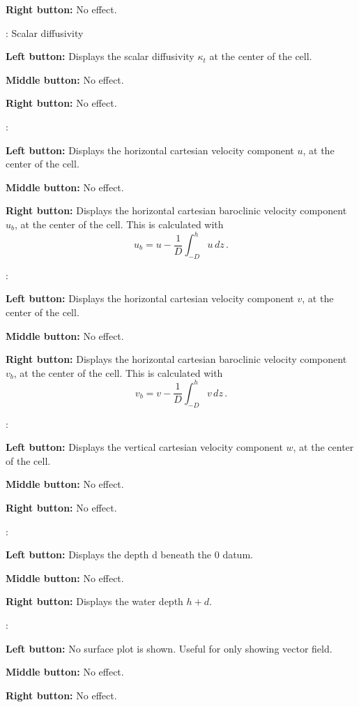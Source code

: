 \documentclass[12pt,oneside]{article}
\begin{document}
\begin{list}{}
\begin{list}{}
\item {\bf Right button:} No effect.
\end{list}
\item {}: Scalar diffusivity
\begin{list}{}
\item {\bf Left button:} Displays the scalar diffusivity $\kappa_t$ at the center of the cell.
\item {\bf Middle button:} No effect.
\item {\bf Right button:} No effect.
\end{list}
\item {}: 
\begin{list}{}
\item {\bf Left button:} Displays the horizontal cartesian velocity component $u$, at the center of the cell.
\item {\bf Middle button:} No effect.
\item {\bf Right button:} Displays the horizontal cartesian baroclinic velocity component $u_b$, at the center of the cell.
This is calculated with
\[
u_b = u - \frac{1}{D}\int_{-D}^h u\,dz\,.
\]
\end{list}
\item {}: 
\begin{list}{}
\item {\bf Left button:} Displays the horizontal cartesian velocity component $v$, at the center of the cell.
\item {\bf Middle button:} No effect.
\item {\bf Right button:} Displays the horizontal cartesian baroclinic velocity component $v_b$, at the center of the cell.
This is calculated with
\[
v_b = v - \frac{1}{D}\int_{-D}^h v\,dz\,.
\]
\end{list}
\item {}: 
\begin{list}{}
\item {\bf Left button:} Displays the vertical cartesian velocity component $w$, at the center of the cell.
\item {\bf Middle button:} No effect.
\item {\bf Right button:} No effect.
\end{list}
\item {}: 
\begin{list}{}
\item {\bf Left button:} Displays the depth d beneath the 0 datum.
\item {\bf Middle button:} No effect.
\item {\bf Right button:} Displays the water depth $h+d$.
\end{list}
\item {}: 
\begin{list}{}
\item {\bf Left button:} No surface plot is shown.  Useful for only showing vector field.
\item {\bf Middle button:} No effect.
\item {\bf Right button:} No effect.
\end{list}
\end{list}
\end{document}
